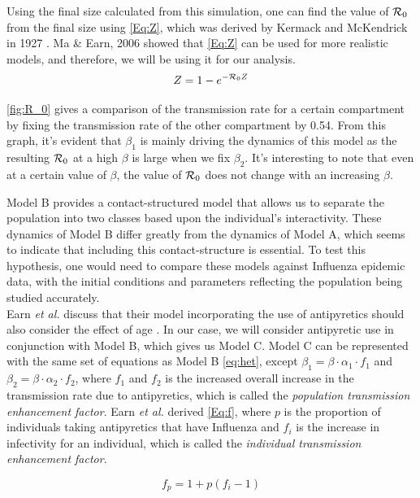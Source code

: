\documentclass[a4paper, 12pt, journal]{ieeeconf}\usepackage[]{graphicx}\usepackage[]{color}
\begin{document}
Using the final size calculated from this simulation, one can find the value of $\R_0$ from the final size using \eqref{Eq:Z}, which was derived by Kermack and McKendrick in 1927 \cite{Kermack700}. Ma \& Earn, 2006 \cite{Ma2006} showed that \eqref{Eq:Z} can be used for more realistic models, and therefore, we will be using it for our analysis.
\begin{equation}\label{Eq:Z}
Z = 1 - e^{-\R_0 Z}
\end{equation}

\ref{fig:R_0} gives a comparison of the transmission rate for a certain compartment by fixing the transmission rate of the other compartment by 0.54. From this graph, it's evident that $\beta_1$ is mainly driving the dynamics of this model as the resulting $\R_0$ at a high $\beta$ is large when we fix $\beta_2$. It's interesting to note that even at a certain value of $\beta$, the value of $\R_0$ does not change with an increasing $\beta$.

Model B provides a contact-structured model that allows us to separate the population into two classes based upon the individual's interactivity. These dynamics of Model B differ greatly from the dynamics of Model A, which seems to indicate that including this contact-structure is essential. To test this hypothesis, one would need to compare these models against Influenza epidemic data, with the initial conditions and parameters reflecting the population being studied accurately. 
\\

Earn \textit{et al.} discuss that their model incorporating the use of antipyretics should also consider the effect of age \cite{Earn_fever}. In our case, we will consider antipyretic use in conjunction with Model B, which gives us Model C. Model C can be represented with the same set of equations as Model B \eqref{eq:het}, except $\beta_1 = \beta \cdot \alpha_1 \cdot f_1$ and $\beta_2 = \beta \cdot \alpha_2 \cdot f_2$, where $f_1$ and $f_2$ is the increased overall increase in the transmission rate due to antipyretics, which is called the \textit{population transmission enhancement factor}. Earn \textit{et al.} derived \eqref{Eq:f}, where $p$ is the proportion of individuals taking antipyretics that have Influenza and  $f_i$ is the increase in infectivity for an individual, which is called the \textit{individual transmission enhancement factor}.

\begin{equation}\label{Eq:f}
f_p = 1 + p(f_i - 1)
\end{equation}
\end{document}
